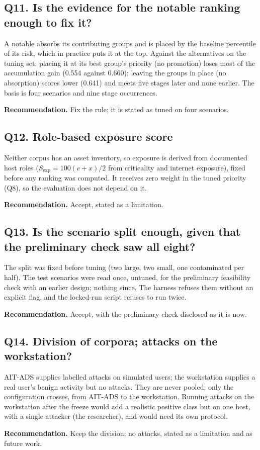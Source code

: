 \documentclass[10.5pt,a4paper]{article}
\newcommand{\rec}[1]{\par\smallskip\noindent\colorbox{gray!12}{\parbox{\dimexpr\linewidth-2\fboxsep}{\textbf{Recommendation.} #1}}\par\smallskip}
\begin{document}
\subsection*{Q11. Is the evidence for the notable ranking enough to fix it?}
A notable absorbs its contributing groups and is placed by the baseline percentile of its risk, which in practice puts it at the top. Against the alternatives on the tuning set: placing it at its best group's priority (no promotion) loses most of the accumulation gain (0.554 against 0.660); leaving the groups in place (no absorption) scores lower (0.641) and meets five stages later and none earlier. The basis is four scenarios and nine stage occurrences.
\rec{Fix the rule; it is stated as tuned on four scenarios.}

\subsection*{Q12. Role-based exposure score}
Neither corpus has an asset inventory, so exposure is derived from documented host roles ($S_\mathrm{exp} = 100(c+x)/2$ from criticality and internet exposure), fixed before any ranking was computed. It receives zero weight in the tuned priority (Q8), so the evaluation does not depend on it.
\rec{Accept, stated as a limitation.}

\subsection*{Q13. Is the scenario split enough, given that the preliminary check saw all eight?}
The split was fixed before tuning (two large, two small, one contaminated per half). The test scenarios were read once, untuned, for the preliminary feasibility check with an earlier design; nothing since. The harness refuses them without an explicit flag, and the locked-run script refuses to run twice.
\rec{Accept, with the preliminary check disclosed as it is now.}

\subsection*{Q14. Division of corpora; attacks on the workstation?}
AIT-ADS supplies labelled attacks on simulated users; the workstation supplies a real user's benign activity but no attacks. They are never pooled; only the configuration crosses, from AIT-ADS to the workstation. Running attacks on the workstation after the freeze would add a realistic positive class but on one host, with a single attacker (the researcher), and would need its own protocol.
\rec{Keep the division; no attacks, stated as a limitation and as future work.}
\end{document}

